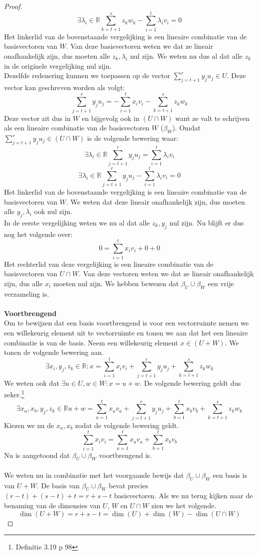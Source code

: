 \documentclass[lineaire_algebra_oplossingen.tex]{subfiles}
\begin{document}
\begin{proof}
\[\]
\[
\exists \lambda_i \in \mathbb{R} \sum_{k=t+1}^sz_kw_k - \sum_{i=1}^t\lambda_iv_i = 0 
\]
Het linkerlid van de bovenstaande vergelijking is een lineaire combinatie van de basisvectoren van $W$. Van deze basisvectoren weten we dat ze lineair onafhankelijk zijn, dus moeten alle $z_k, \lambda_i$ nul zijn. We weten nu dus al dat alle $z_k$ in de originele vergelijking nul zijn.\\
Dezelfde redenering kunnen we toepassen op de vector $\sum_{j=t+1}^ry_ju_j \in U$. Deze vector kan geschreven worden als volgt:
\[
\sum_{j=t+1}^ry_ju_j= -\sum_{i=1}^tx_iv_i - \sum_{k=t+1}^sz_kw_k
\]
Deze vector zit dus in $W$ en bijgevolg ook in $(U\cap W)$ want ze valt te schrijven als een lineaire combinatie van de basisvectoren $W$ ($\beta_W$). Omdat $\sum_{j=t+1}^ry_ju_j \in (U\cap W)$ is de volgende bewering waar:
\[
\exists \lambda_i \in \mathbb{R} \sum_{j=t+1}^ry_ju_j = \sum_{i=1}^t\lambda_iv_i
\]
\[
\exists \lambda_i \in \mathbb{R} \sum_{j=t+1}^ry_ju_j - \sum_{i=1}^t\lambda_iv_i = 0 
\]
Het linkerlid van de bovenstaande vergelijking is een lineaire combinatie van de basisvectoren van $W$. We weten dat deze lineair onafhankelijk zijn, dus moeten alle $y_j,  \lambda_i$ ook nul zijn.\\
In de eerste vergelijking weten we nu al dat alle $z_k,y_j$ nul zijn. Nu blijft er dus nog het volgende over:
\[
0 = \sum_{i=1}^tx_iv_i + 0 + 0
\]
Het rechterlid van deze vergelijking is een lineaire combinatie van de basisvectoren van $U\cap W$. Van deze vectoren weten we dat ze lineair onafhankelijk zijn, dus alle $x_i$ moeten nul zijn.
We hebben bewezen dat $\beta_U\cup \beta_W$ een vrije verzameling is.\\\\
\textbf{Voortbrengend}\\
Om te bewijzen dat een basis voortbrengend is voor een vectorruimte nemen we een willekeurig element uit te vectorruimte en tonen we aan dat het een lineaire combinatie is van de basis.
Neem een willekeurig element $x \in (U + W)$. We tonen de volgende bewering aan.
\[
\exists x_i,y_j,z_k \in \mathbb{R}: x = \sum_{i=1}^tx_iv_i + \sum_{j=t+1}^ry_ju_j + \sum_{k=t+1}^sz_kw_k
\]
We weten ook dat $\exists u\in U, w\in W: x = u+w$. De volgende bewering geldt dus zeker.\footnote{Definitie 3.19 p 98}
\[
\exists x_a,x_b,y_j,z_k \in \mathbb{R}  u+w = \sum_{a=1}^tx_av_a + \sum_{j=t+1}^ry_ju_j + \sum_{b=1}^tx_bv_b + \sum_{k=t+1}^sz_kw_k
\]
Kiezen we nu de $x_a,x_b$ zodat de volgende bewering geldt.
\[
\sum_{i=1}^tx_iv_i = \sum_{a=1}^tx_av_a + \sum_{b=1}^tx_bv_b 
\]
Nu is aangetoond dat $\beta_U \cup \beta_W$ voortbrengend is.
\\\\ 
We weten nu in combinatie met het voorgaande bewijs dat $\beta_U \cup \beta_W$ een basis is van $U+W$. De basis van $\beta_U \cup \beta_W$ bevat precies $(r-t)+(s-t)+t = r+s-t$ basisvectoren. Als we nu terug kijken naar de benaming van de dimensies van $U$, $W$ en $U\cap W$ zien we het volgende.
\[
\dim(U+W) = r+s-t = \dim(U) + \dim(W) - \dim(U \cap W)
\]
\end{proof}
\end{document}
